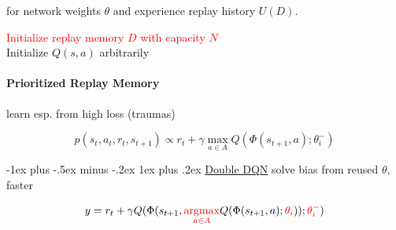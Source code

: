 \documentclass[10pt,landscape]{article}
\makeatletter
\renewcommand{\subsubsection}{\@startsection{subsubsection}{3}{0mm}%
    {-1ex plus -.5ex minus -.2ex}%
    {1ex plus .2ex}%
    {\normalfont\small\bfseries}}
\DeclareMathOperator*{\argmax}{argmax}
\makeatother
\begin{document}
\begin{multicols}{3}
for network weights $\theta$ and experience replay history $U(D)$.

\begin{algorithm}[H]
 \textcolor{red}{Initialize replay memory $D$ with capacity $N$}\\
 Initialize $Q(s,a)$ arbitrarily \\
\end{algorithm}

\paragraph{Prioritized Replay Memory}
learn esp. from high loss (traumas)

\begin{equation}
    p(s_{t},a_{t},r_{t},s_{t+1}) \propto r_{t} + \gamma \max\limits_{a \in A} Q(\Phi(s_{t+1},a); \theta_{i}^{-})
\end{equation}

\subsubsection{\href{https://en.wikipedia.org/wiki/Q-learning\#Double_Q-learning}{Double DQN}}
solve bias from reused $\theta$, faster

\begin{equation}
    y = r_t + \gamma Q(\Phi(s_{t+1}, \textcolor{red}{\argmax\limits_{a \in A}} Q(\Phi(s_{t+1},a); \textcolor{red}{\theta_i})); \textcolor{red}{\theta_i^{-}})
\end{equation}


\end{multicols}
\end{document}
